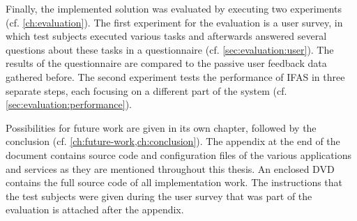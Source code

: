 Finally, the implemented solution was evaluated by executing two experiments (cf. \cref{ch:evaluation}).
The first experiment for the evaluation is a user survey, in which test subjects executed various tasks and afterwards answered several questions about these tasks in a questionnaire (cf. \cref{sec:evaluation:user}).
The results of the questionnaire are compared to the passive user feedback data gathered before.
The second experiment tests the performance of \ac{IFAS} in three separate steps, each focusing on a different part of the system (cf. \cref{sec:evaluation:performance}).

Possibilities for future work are given in its own chapter, followed by the conclusion (cf. \cref{ch:future-work,ch:conclusion}).
The appendix at the end of the document contains source code and configuration files of the various applications and services as they are mentioned throughout this thesis.
An enclosed DVD contains the full source code of all implementation work.
The instructions that the test subjects were given during the user survey that was part of the evaluation is attached after the appendix.
